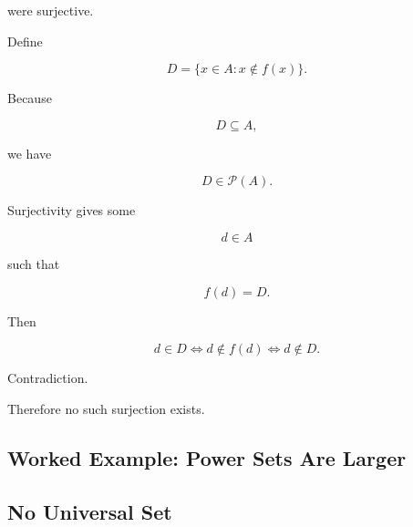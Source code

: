 were surjective.

Define

\[
\boxed{
D
=
\{x\in A:x\notin f(x)\}.
}
\]

Because

\[
D\subseteq A,
\]

we have

\[
D\in\mathcal{P}(A).
\]

Surjectivity gives some

\[
d\in A
\]

such that

\[
f(d)=D.
\]

Then

\[
d\in D
\iff
d\notin f(d)
\iff
d\notin D.
\]

Contradiction.

Therefore no such surjection exists.

\subsection{Worked Example: Power Sets Are Larger}
\label{subsec:worked-cantor-power-set}


\subsection{No Universal Set}
\label{subsec:no-universal-set}

